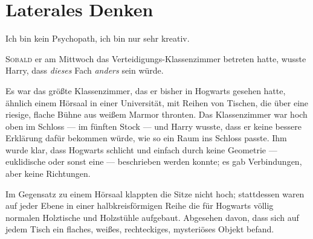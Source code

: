 \chapter{Laterales Denken}

\begin{chapterOpeningQuote}
Ich bin kein Psychopath, ich bin nur sehr kreativ.
\end{chapterOpeningQuote}

\lettrine{S}{obald} er am Mittwoch das Verteidigungs-Klassenzimmer betreten hatte, wusste Harry, dass \emph{dieses} Fach \emph{anders} sein würde.

Es war das größte Klassenzimmer, das er bisher in Hogwarts gesehen hatte, ähnlich einem Hörsaal in einer Universität, mit Reihen von Tischen, die über eine riesige, flache Bühne aus weißem Marmor thronten. Das Klassenzimmer war hoch oben im Schloss — im fünften Stock — und Harry wusste, dass er keine bessere Erklärung dafür bekommen würde, wie so ein Raum ins Schloss passte. Ihm wurde klar, dass Hogwarts schlicht und einfach durch keine Geometrie — euklidische oder sonst eine — beschrieben werden konnte; es gab Verbindungen, aber keine Richtungen.

Im Gegensatz zu einem Hörsaal klappten die Sitze nicht hoch; stattdessen waren auf jeder Ebene in einer halbkreisförmigen Reihe die für Hogwarts völlig normalen Holztische und Holzstühle aufgebaut. Abgesehen davon, dass sich auf jedem Tisch ein flaches, weißes, rechteckiges, mysteriöses Objekt befand.

